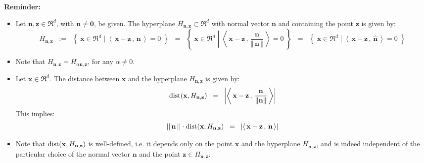 \documentclass{article}
\begin{document}
\vskip 0.5cm
\noindent
\textbf{Reminder:}
\begin{itemize}
\item  Let $\mathbf{n}, \mathbf{z} \in \Re^{d}$, with $\mathbf{n} \neq \mathbf{0}$, be given.
          The hyperplane $H_{\mathbf{n},\mathbf{z}} \subset \Re^{d}$ with normal vector $\mathbf{n}$ and
          containing the point $\mathbf{z}$ is given by: 
          \begin{equation*}
          H_{\mathbf{n},\mathbf{z}}
          \;\; := \;\;
          \left\{\;\mathbf{x}\in\Re^{d}\;\left\vert\;\left\langle\,\mathbf{x}-\mathbf{z}\,,\,\mathbf{n}\,\right\rangle = 0 \right.\;\right\}
          \;\; = \;\;
          \left\{\;\mathbf{x}\in\Re^{d}\;\left\vert\;\left\langle\,\mathbf{x}-\mathbf{z}\,,\,\frac{\mathbf{n}}{\Vert\,\mathbf{n}\,\Vert}\,\right\rangle = 0 \right.\;\right\}
          \;\; = \;\;
          \left\{\;\mathbf{x}\in\Re^{d}\;\left\vert\;\left\langle\,\mathbf{x}-\mathbf{z}\,,\,\widehat{\mathbf{n}}\,\right\rangle = 0 \right.\;\right\}
          \end{equation*}
\item  Note that $H_{\mathbf{n},\mathbf{z}} = H_{\alpha\mathbf{n},\mathbf{z}}$, for any $\alpha \neq 0$.
\item  Let $\mathbf{x} \in \Re^{d}$.  The distance between $\mathbf{x}$ and the hyperplane $H_{\mathbf{n},\mathbf{z}}$
          is given by:
          \begin{equation*}
          \textnormal{dist}\!\left(\mathbf{x},H_{\mathbf{n},\mathbf{z}}\right) \;\; = \;\;
          \left\vert
          \left\langle\,\mathbf{x}-\mathbf{z}\,,\,\dfrac{\mathbf{n}}{\Vert\mathbf{n}\Vert}\,\right\rangle
          \right\vert
          \end{equation*}
          This implies:
          \begin{equation*}
          ||\,\mathbf{n}\,||\cdot\textnormal{dist}\!\left(\mathbf{x},H_{\mathbf{n},\mathbf{z}}\right) \;\; = \;\;
          \left\vert\left\langle\,\mathbf{x}-\mathbf{z}\,,\,\mathbf{n}\,\right\rangle\right\vert
          \end{equation*}
\item  Note that $\textnormal{dist}\!\left(\mathbf{x},H_{\mathbf{n},\mathbf{z}}\right)$ is well-defined, i.e. it depends only on the point
          $\mathbf{x}$ and the hyperplane $H_{\mathbf{n},\mathbf{z}}$, and is indeed independent of the particular choice
          of the normal vector $\mathbf{n}$ and the point $\mathbf{z} \in H_{\mathbf{n},\mathbf{z}}$. 
\end{itemize}
\end{document}
